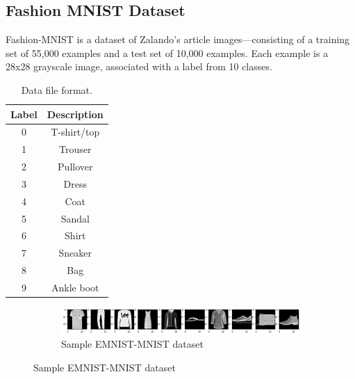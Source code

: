     
\subsection{Fashion MNIST Dataset}
Fashion-MNIST is a dataset of Zalando's article images—consisting of a training set of 55,000 examples and a test set of 10,000 examples. Each example is a 28x28 grayscale image, associated with a label from 10 classes. 

\begin{table}[ht]
\centering
\begin{tabular}{|c|c|}
\hline
\textbf{Label} & \textbf{Description} \\ \hline
0  &   T-shirt/top \\ \hline
1  &   Trouser \\ \hline
2   &	Pullover \\ \hline
3   &	Dress \\ \hline
4   &	Coat \\ \hline
5   &	Sandal \\ \hline
6   &	Shirt \\ \hline
7   &	Sneaker \\ \hline
8   &	Bag \\ \hline
9   &	Ankle boot \\ \hline
\end{tabular}
\caption{Data file format.}
\label{tbl:training-file-format}
\end{table}

\begin{figure}[htb!]
        \centering
        \begin{subfigure}[b]{\textwidth}
            \centering
            \includegraphics[width=\linewidth]{images/fashion.png}
            \caption{Sample EMNIST-MNIST dataset}
            \label{fig:EMNIST MNIST dataset}
        \end{subfigure}%
        \label{fig:Rotate-misclassifications}
    \end{figure}
    \FloatBarrier
    
